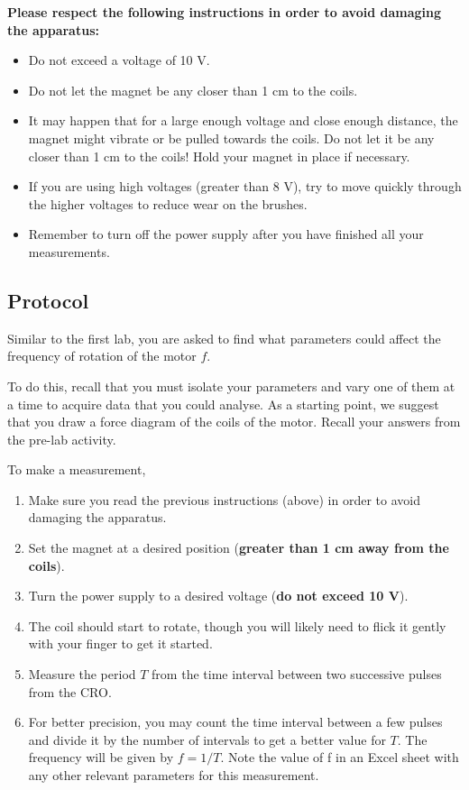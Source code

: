 \documentclass[12pt]{report}
\begin{document}
\large \textbf{Please respect the following instructions in order to avoid damaging the apparatus:} \normalsize
\begin{itemize}
\item Do not exceed a voltage of 10 V.
\item Do not let the magnet be any closer than 1 cm to the coils.
\item It may happen that for a large enough voltage and close enough distance, the magnet might vibrate or be pulled towards the coils. Do not let it be any closer than 1 cm to the coils! Hold your magnet in place if necessary.
\item If you are using high voltages (greater than 8 V), try to move quickly through the higher voltages to reduce wear on the brushes.
\item Remember to turn off the power supply after you have finished all your measurements.
\end{itemize}


\subsection{Protocol}
Similar to the first lab, you are asked to find what parameters could affect the frequency of rotation of the motor $f$.

To do this, recall that you must isolate your parameters and vary one of them at a time to acquire data that you could analyse. As a starting point, we suggest that you draw a force diagram of the coils of the motor. Recall your answers from the pre-lab activity.

To make a measurement,
\begin{enumerate}
\item Make sure you read the previous instructions (above) in order to avoid damaging the apparatus.
\item Set the magnet at a desired position (\textbf{greater than 1 cm away from the coils}).
\item Turn the power supply to a desired voltage (\textbf{do not exceed 10 V}).
\item The coil should start to rotate, though you will likely need to flick it gently with your finger to get it started.
\item Measure the period $T$ from the time interval between two successive pulses from the CRO.
\item For better precision, you may count the time interval between a few pulses and divide it by the number of intervals to get a better value for $T$. The frequency will be given by $f = 1/T$. Note the value of f in an Excel sheet with any other relevant parameters for this measurement.
\end{enumerate}
\end{document}
